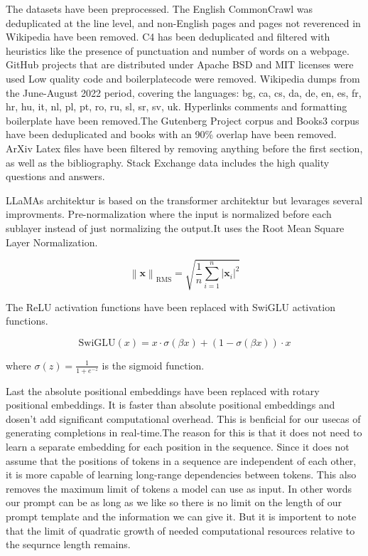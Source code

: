 The datasets have been preprocessed. The English CommonCrawl  was deduplicated at the line level, and non-English pages and pages not reverenced in Wikipedia have been removed. C4 has been deduplicated and filtered with heuristics like the presence of punctuation and number of words on a webpage. GitHub projects that are distributed under Apache BSD and MIT licenses were used Low quality code and boilerplatecode were removed.
Wikipedia dumps from the June-August 2022 period, covering the languages: bg, ca, cs, da, de, en, es, fr, hr, hu, it, nl, pl, pt, ro, ru, sl, sr, sv, uk. Hyperlinks comments and formatting boilerplate have been removed.The Gutenberg Project corpus and Books3 corpus have been deduplicated and books with an 90\% overlap have been removed. 
ArXiv Latex files have been filtered by removing anything before the first section, as well as the bibliography. Stack Exchange data includes the high quality questions and answers. 



LLaMAs architektur is based on the transformer architektur but levarages several improvments. Pre-normalization where the input is normalized before each sublayer instead  of just normalizing the output.It uses the Root Mean Square Layer Normalization\cite{zhang2019root}.

\newcommand{\norm}[1]{\left\lVert#1\right\rVert}

\[
\norm{\mathbf{x}}_{\text{RMS}} = \sqrt{\frac{1}{n} \sum_{i=1}^n |\mathbf{x}_i|^2}
\]


The ReLU activation functions have been replaced with SwiGLU activation functions.


\begin{equation}
\text{SwiGLU}(x) = x \cdot \sigma(\beta x) + (1 - \sigma(\beta x)) \cdot x
\end{equation}

where \(\sigma(z) = \frac{1}{1 + e^{-z}}\) is the sigmoid function.

Last the absolute positional embeddings have been replaced with rotary positional embeddings. It is faster than absolute positional embeddings and dosen't add significant computational overhead. This is benficial for our usecas of generating completions in real-time.The reason for this is that it does not need to learn  a separate embedding for each position in the sequence. Since it does not assume that the positions of tokens in a sequence are independent of each other, it is more capable of learning long-range dependencies between tokens. This also removes the maximum limit of tokens a model can use as input. In other words our prompt can be as long as we like so there is no limit on the length of our prompt template and the information we can give it. But it is importent to note that the limit of quadratic growth of needed computational resources 
relative to the sequrnce length remains.



